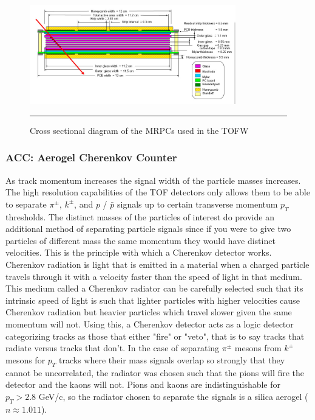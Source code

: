 \begin{figure}[ht!]
  \centering
    \includegraphics[width=0.8\textwidth]{Figures/MRPC_TOFW.jpg}
    \rule{35em}{0.5pt}
  \caption[Cross sectional diagram of the MRPCs used in the TOFW]{Cross sectional diagram of the MRPCs used in the TOFW}
  \label{fig:MRPCTOFW}
\end{figure}

\subsubsection{ACC: Aerogel Cherenkov Counter}
As track momentum increases the signal width of the particle masses increases. The high resolution capabilities of the TOF detectors only allows them to be able to separate $\pi^{\pm}$, $k^{\pm}$, and $p$ / $\bar{p}$ signals up to certain transverse momentum $p_{T}$ thresholds. The distinct masses of the particles of interest do provide an additional method of separating particle signals since if you were to give two particles of different mass the same momentum they would have distinct velocities. This is the principle with which a Cherenkov detector works. Cherenkov radiation is light that is emitted in a material when a charged particle travels through it with a velocity faster than the speed of light in that medium. This medium called a Cherenkov radiator can be carefully selected such that its intrinsic speed of light is such that lighter particles with higher velocities cause Cherenkov radiation but heavier particles which travel slower given the same momentum will not. Using this, a Cherenkov detector acts as a logic detector categorizing tracks as those that either "fire" or "veto", that is to say tracks that radiate versus tracks that don't. In the case of separating $\pi^{\pm}$ mesons from $k^{\pm}$ mesons for $p_{T}$ tracks where their mass signals overlap so strongly that they cannot be uncorrelated, the radiator was chosen such that the pions will fire the detector and the kaons will not. Pions and kaons are indistinguishable for $p_{T} > 2.8$ GeV/c, so the radiator chosen to separate the signals is a silica aerogel ($n \approx 1.011$).

